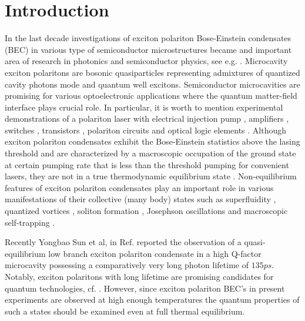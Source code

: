\documentclass[aps, pre, preprint, groupedaddress, superscriptaddress, showkeys, showpacs] {revtex4-1}
\begin{document}
\newcommand{\sn}{\textrm{sn}}
\newcommand{\cn}{\textrm{cn}}
\newcommand{\dn}{\textrm{dn}}
\newcommand{\sd}{\textrm{sd}}
\newcommand{\cd}{\textrm{cd}}
\newcommand{\nd}{\textrm{nd}}
\newcommand{\am}{\textrm{am}}

\section{Introduction \label{sec:introduction}}

In the last decade investigations of exciton polariton Bose-Einstein condensates (BEC) in various type of semiconductor microstructures became and important area of research in photonics and semiconductor physics, see e.g. \cite{Sanvitto, Guillet}.
Microcavity exciton polaritons are bosonic quasiparticles representing admixtures of quantized cavity photons mode and quantum well excitons.
Semiconductor microcavities are promising for various optoelectronic applications where the quantum  matter-field interface plays crucial role.
In particular, it is worth to mention experimental demonstrations of a polariton laser with electrical injection pump \cite{Bhattacharya,Schneider}, amplifiers \cite{Niemietz}, switches \cite{Amo_2010}, transistors \cite{Ballarini}, polariton circuits and optical logic elements \cite{Sturm,Liew}.
Although exciton polariton condensates exhibit the Bose-Einstein statistics above the lasing threshold and are characterized by a macroscopic occupation of the ground state at certain pumping rate that is less than the threshold pumping for convenient lasers, they are not in a true thermodynamic equilibrium state \cite{Byrnes_2014,Sun}. Non-equilibrium features of exciton polariton condensates play an important role in various manifestations of their collective (many body) states such as superfluidity \cite{Carusotto_2013,Amo_2009}, quantized vortices \cite{Lagoudakis_2008,Lagoudakis_2009}, soliton formation \cite{Sich}, Josephson oscillations and macroscopic self-trapping \cite{Abbarchi,Lagoudakis_2010}.

Recently Yongbao Sun et al, in Ref. \cite{Snoke_2017} reported the observation of a quasi-equilibrium low branch exciton polariton condensate in a high Q-factor microcavity possessing a comparatively very long photon lifetime of $135ps$. Notably, exciton polaritons with long lifetime are promising candidates for quantum technologies, cf. \cite{Demirchyan}. However, since exciton polariton BEC's in present experiments are observed at high enough temperatures the quantum properties of such a states should be examined even at full thermal equilibrium. 
    
\end{document}

